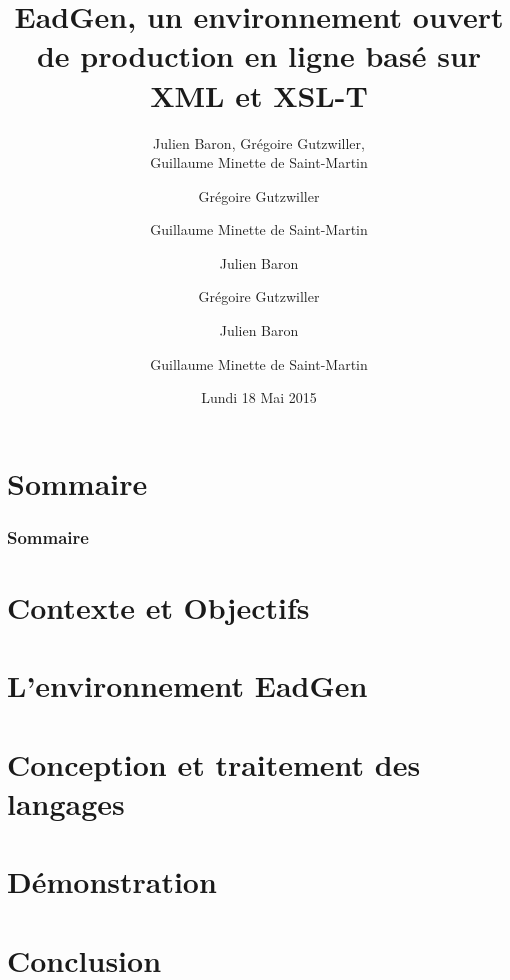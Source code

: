 \documentclass[11pt, handout]{beamer}
\title[EadGen]{EadGen, un environnement ouvert de production en ligne basé sur 
XML et XSL-T}
\author{Julien Baron, Grégoire Gutzwiller, \\ Guillaume Minette de Saint-Martin}
\date[18/05/2015]{Lundi 18 Mai 2015}
\begin{document}
\begin{frame}[plain]
	\maketitle
\end{frame}

\author{Grégoire Gutzwiller}
\section*{Sommaire}
\begin{frame}
	\frametitle{Sommaire}
	\tableofcontents
\end{frame}

\author{Guillaume Minette de Saint-Martin}
\section{Contexte et Objectifs}


\author{Julien Baron}
\section{L'environnement EadGen}


\author{Grégoire Gutzwiller}
\section{Conception et traitement des langages}


\author{Julien Baron}
\section{Démonstration}


\author{Guillaume Minette de Saint-Martin}
\section{Conclusion}

\end{document}
